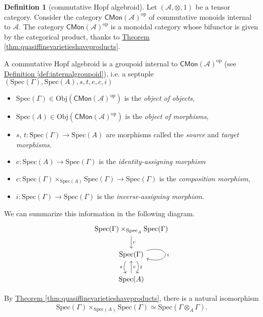 \documentclass[a4paper]{report}
\newcommand{\Obj}{\mathrm{Obj}}
\newcommand{\Spec}{\mathrm{Spec}}
\theoremstyle{definition}
\newtheorem{definition}{Definition}[section]
\theoremstyle{plain}
\theoremstyle{remark}
\begin{document}
\begin{definition}[commutative Hopf algebroid]
  \label{def:commutativehopfalgebroid}
  Let $(\mathscr{A}, \otimes, 1)$ be a tensor category. Consider the category $\mathsf{CMon}(\mathscr{A})^{\mathrm{op}}$ of commutative monoids internal to $\mathscr{A}$. The category $\mathsf{CMon}(\mathscr{A})^{\mathrm{op}}$ is a monoidal category whose bifunctor is given by the categorical product, thanks to \hyperref[thm:quasiffinevarietieshaveproducts]{Theorem \ref*{thm:quasiffinevarietieshaveproducts}}.

  A commutative Hopf algebroid is a groupoid internal to $\mathsf{CMon}(\mathscr{A})^{\mathrm{op}}$ (see \hyperref[def:internalgroupoid]{Definition \ref*{def:internalgroupoid}}), i.e. a septuple $(\Spec(\Gamma), \Spec(A), s, t, e, c, i)$
  \begin{itemize}
    \item $\Spec(\Gamma) \in \Obj(\mathsf{CMon}(\mathscr{A})^{\mathrm{op}})$ is the \emph{object of objects}, 
    \item $\Spec(A) \in \Obj(\mathsf{CMon}(\mathscr{A})^{\mathrm{op}})$ is the \emph{object of morphisms},
    \item $s$, $t\colon \Spec(\Gamma) \to \Spec(A)$ are morphisms called the \emph{source} and \emph{target morphisms}.
    \item $e\colon \Spec(A) \to \Spec(\Gamma)$ is the \emph{identity-assigning morphism}
    \item $c\colon \Spec(\Gamma) \times_{\Spec(A)} \Spec(\Gamma) \to \Spec(\Gamma)$ is the \emph{composition morphism},
    \item $i\colon \Spec(\Gamma) \to \Spec(\Gamma)$ is the \emph{inverse-assigning morphism}.
  \end{itemize}

  We can summarize this information in the following diagram.
  \begin{equation*}
    \begin{tikzcd}
      \Spec(\Gamma) \times_{\Spec_{A}} \Spec(\Gamma)
      \arrow[d, "c"]
      \\
      \Spec(\Gamma)
      \arrow[d, shift left, bend left, "t"]
      \arrow[d, shift right, bend right, swap, "s"]
      \arrow[loop right, "i"]
      \\
      \Spec(A)
      \arrow[u, swap, "e"]
    \end{tikzcd}
  \end{equation*}

  By \hyperref[thm:quasiffinevarietieshaveproducts]{Theorem \ref*{thm:quasiffinevarietieshaveproducts}}, there is a natural isomorphism
  \begin{equation*}
    \Spec(\Gamma) \times_{\Spec(A)} \Spec(\Gamma) \simeq \Spec(\Gamma \otimes_{A} \Gamma).
  \end{equation*}


\end{definition}
\end{document}
